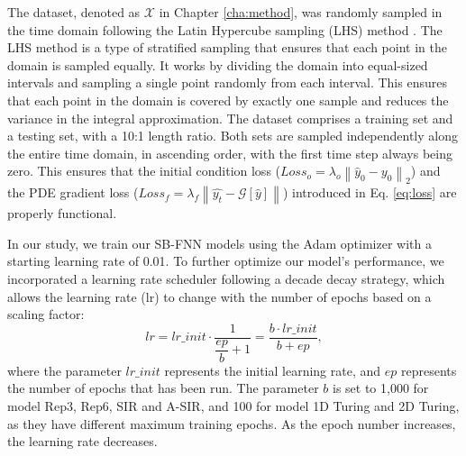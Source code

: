 The dataset, denoted as $\mathcal{X}$ in Chapter \ref{cha:method}, was randomly sampled in the time domain following the Latin Hypercube sampling (LHS) method \cite{mckay1979two}. The LHS method is a type of stratified sampling that ensures that each point in the domain is sampled equally. It works by dividing the domain into equal-sized intervals and sampling a single point randomly from each interval. This ensures that each point in the domain is covered by exactly one sample and reduces the variance in the integral approximation. The dataset comprises a training set and a testing set, with a 10:1 length ratio. Both sets are sampled independently along the entire time domain, in ascending order, with the first time step always being zero. This ensures that the initial condition loss ($Loss_{o}=\lambda_{o}\left\| \widehat{y}_{0}-y_{0}\right\|_{2}$) and the PDE gradient loss ($Loss_{f}=\lambda_{f}\left\| \widehat{y_{t}}-\mathcal{G}\left[\widehat{y}\right]\right\|$) introduced in Eq. \ref{eq:loss} are properly functional.

In our study, we train our SB-FNN models using the Adam optimizer with a starting learning rate of 0.01. To further optimize our model's performance, we incorporated a learning rate scheduler
following a decade decay strategy, which allows the learning rate (lr) to change with the number of epochs based on a scaling factor:
\begin{equation}
\label{eq:lr}
lr = lr\_init \cdot \dfrac{1}{\dfrac{ep}{b} + 1} = \dfrac{b\cdot lr\_init}{b+ep},
\end{equation}
where the parameter $lr\_init$ represents the initial learning rate, and $ep$ represents the number of epochs that has been run. The parameter $b$ is set to 1,000 for model Rep3, Rep6, SIR and A-SIR, and 100 for model 1D Turing and 2D Turing, as they have different maximum training epochs. As the epoch number increases, the learning rate decreases.


